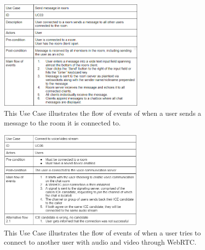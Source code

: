 \begin{figure}[H]
    \centering
    \includegraphics[width=0.65\textwidth]{Pictures/UseCaseSendMessage.png}
    \caption{This Use Case illustrates the flow of events of when a user sends a message to the room it is connected to.}
    \label{fig:usecase6}
\end{figure}

\newpage

\begin{figure}[H]
    \centering
    \includegraphics[width=0.65\textwidth]{Pictures/UseCaseWebRTC.png}
    \caption{This Use Case illustrates the flow of events of when a user tries to connect to another user with audio and video through WebRTC.}
    \label{fig:usecase7}
\end{figure}

\newpage
